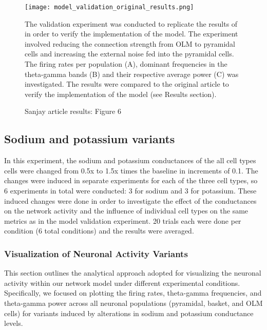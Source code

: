 \begin{figure}[htbp]
    \centering
    \texttt{[image: model\_validation\_original\_results.png]}
    \caption[Sanjay article results: Figure 6]{Sanjay article results: Figure 6}\label{fig:validation_original_results}
    \begin{minipage}{0.9\textwidth}
        The validation experiment was conducted to replicate the results of
        \textcite{sanjayImpairedDendriticInhibition2015} in order to verify the
        implementation of the model. The experiment involved reducing the
        connection strength from OLM to pyramidal cells and increasing the
        external noise fed into the pyramidal cells. The firing rates per population (A), dominant frequencies in the theta-gamma bands (B) and their respective average power (C) was investigated.
        The results were compared to the original article to verify the implementation of the model (see Results section).
    \end{minipage}
\end{figure}

\subsection{Sodium and potassium variants}
In this experiment, the sodium and potassium conductances of the all cell types
cells were changed from 0.5x to 1.5x times the baseline in increments of 0.1.
The changes were induced in separate experiments for each of the three cell
types, so 6 experiments in total were conducted: 3 for sodium and 3 for
potassium. These induced changes were done in order to investigate the effect
of the conductances on the network activity and the influence of individual
cell types on the same metrics as in the model validation experiment. 20 trials
each were done per condition (6 total conditions) and the results were
averaged.

\subsubsection{Visualization of Neuronal Activity Variants}
This section outlines the analytical approach adopted for visualizing the
neuronal activity within our network model under different experimental
conditions. Specifically, we focused on plotting the firing rates, theta-gamma
frequencies, and theta-gamma power across all neuronal populations (pyramidal,
basket, and OLM cells) for variants induced by alterations in sodium and
potassium conductance levels.

